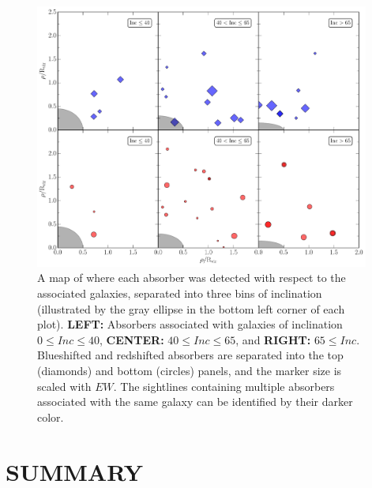 \documentclass[twocolumn,tighten]{aastex6}
\begin{document}
\begin{figure}[ht!]
        \centering
        \includegraphics[width=0.98\textwidth]{fig13.pdf}
        \caption{\small{A map of where each absorber was detected with respect to the associated galaxies, separated into three bins of inclination (illustrated by the gray ellipse in the bottom left corner of each plot). \textbf{LEFT:} Absorbers associated with galaxies of inclination $0 \leq Inc \le 40$, \textbf{CENTER:} $40 \leq Inc \le 65$, and \textbf{RIGHT: } $65 \leq Inc$. Blueshifted and redshifted absorbers are separated into the top (diamonds) and bottom (circles) panels, and the marker size is scaled with $EW$. The sightlines containing multiple absorbers associated with the same galaxy can be identified by their darker color.}}
        \label{azimuthMap}
        \vspace{5pt}
\end{figure} 



\section{SUMMARY}
\end{document}

